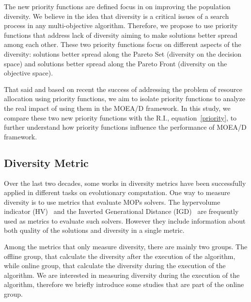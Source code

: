 The new priority functions are defined focus in on improving the population diversity. We believe in the idea that diversity is a critical issues of a search process in any multi-objective algorithm. Therefore, we propose to use priority functions that address lack of diversity aiming to make solutions better spread among each other. These two priority functions focus on different aspects of the diversity: solutions better spread along the Pareto Set (diversity on the decision space) and solutions better spread along the Pareto Front (diversity on the objective space).

That said and based on recent the success of addressing the problem of resource allocation using priority functions, we aim to isolate priority functions to analyze the real impact of using them in the MOEA/D framework. In this study, we compare these two new priority functions with the R.I., equation~\ref{priority}, to further understand how priority functions influence the performance of MOEA/D framework.




\subsection{Diversity Metric}


Over the last two decades, some works in diversity metrics have been successfully applied in different tasks on evolutionary computation. One way to measure diversity is to use metrics that evaluate MOPs solvers. The hypervolume indicator (HV)~\cite{zitzler1998multiobjective} and the Inverted Generational Distance (IGD)~\cite{zhang2008rm} are frequently used as metrics to evaluate such solvers. However they include information about both quality of the solutions and diversity in a single metric.

Among the metrics that only measure diversity, there are mainly two groups. The offline group, that calculate the diversity after the execution of the algorithm, while online group, that calculate the diversity during the execution of the algorithm. We are interested in measuring diversity during the execution of the algorithm, therefore we  briefly introduce some studies that are part of the online group.
%

